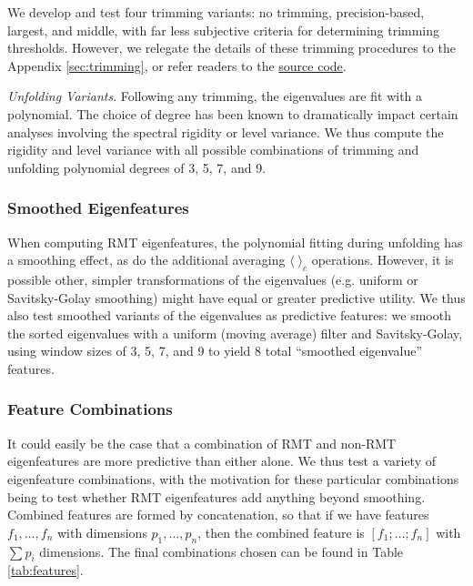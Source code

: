 \documentclass[12pt]{spieman}  %
\begin{document}
\begin{spacing}{2}
We develop and test four trimming variants: no trimming, precision-based,
largest, and middle, with far less subjective criteria for determining trimming
thresholds. However, we relegate the details of these trimming procedures to
the Appendix \ref{sec:trimming}, or refer readers to the
\href{https://github.com/DM-Berger/random-matrix-fmri/blob/7c9e4187f582dedee728cd7193b8894d928c2f00/code/rmt/updated_dataset.py#L431-L444}{source
code}.

\textit{Unfolding Variants}. Following any trimming, the eigenvalues are fit
with a polynomial. The choice of degree has been known to dramatically impact
certain analyses involving the spectral rigidity or level
variance\cite{abul-magdUnfoldingSpectrumChaotic2014,
moralesImprovedUnfoldingDetrending2011, abueleninSpectralUnfoldingChaotic2018,
fossionRandommatrixSpectraTime2013, abueleninEffectUnfoldingSpectral2012}. We
thus compute the rigidity and level variance with all possible combinations of
trimming and unfolding polynomial degrees of 3, 5, 7, and 9.

\subsubsection{Smoothed Eigenfeatures}
\label{sec:eigs-only}

When computing RMT eigenfeatures, the polynomial fitting during unfolding
has a smoothing effect, as do the additional averaging \(\langle\;\rangle_c\)
operations. However, it is possible other, simpler
transformations of the eigenvalues (e.g. uniform or Savitsky-Golay smoothing)
might have equal or greater predictive utility. We thus also test smoothed
variants of the eigenvalues as predictive features: we smooth the sorted
eigenvalues with a uniform (moving average) filter and Savitsky-Golay, using
window sizes of 3, 5, 7, and 9 to yield 8 total ``smoothed eigenvalue'' features.

\subsubsection{Feature Combinations}

It could easily be the case that a combination of RMT and non-RMT eigenfeatures
are more predictive than either alone. We thus test a variety of eigenfeature
combinations, with the motivation for these particular combinations being to
test whether RMT eigenfeatures add anything beyond smoothing. Combined features
are formed by concatenation, so that if we have features \(f_1, \dots,  f_n\)
with dimensions \(p_1, \dots, p_n\), then the combined feature is \([f_1;
\dots; f_n]\) with \(\sum p_i\) dimensions.  The final combinations chosen can
be found in Table \ref{tab:features}.



\end{spacing}
\end{document}
